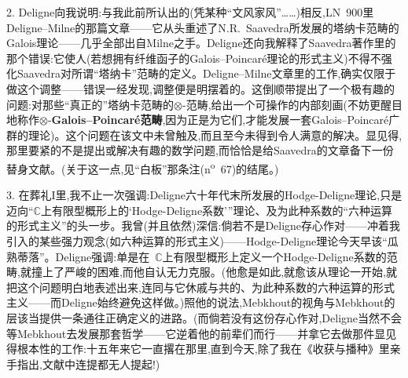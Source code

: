 2. Deligne向我说明:与我此前所认出的\dmark{}(凭某种“文风家风”……)相反,LN~900里Deligne--Milne的那篇文章——它从头重述了N.R.~Saavedra所发展的塔纳卡范畴的Galois理论——几乎全部出自Milne之手。Deligne还向我解释了Saavedra著作里的那个错误:它使人(若想拥有纤维函子的Galois--Poincaré理论的形式主义)不得不强化Saavedra对所谓“塔纳卡”范畴的定义。Deligne--Milne文章里的工作,确实仅限于做这个调整——错误一经发现,调整便是明摆着的。这倒顺带提出了一个极有趣的问题:对那些“真正的”塔纳卡范畴的$\otimes$-范畴,给出一个可操作的内部刻画(不妨更醒目地称作$\otimes$-\textbf{Galois--Poincaré范畴},因为正是为它们,才能发展一套Galois--Poincaré广群的理论)。这个问题在该文中未曾触及,而且至今未得到令人满意的解决。显见得,那里要紧的不是提出或解决有趣的数学问题,而恰恰是给Saavedra的文章备下一份替身文献。(关于这一点,见“白板”那条注(n\textsuperscript{o}~67)的结尾。)

3. 在葬礼I里,我不止一次强调:Deligne六十年代末所发展的Hodge-Deligne理论,只是迈向“$\mathbb{C}$上有限型概形上的‘Hodge-Deligne系数’”理论、及为此种系数的“六种运算的形式主义”的头一步。我曾(并且依然)深信:倘若不是Deligne存心作对——冲着我引入的某些强力观念(如六种运算的形式主义)——Hodge-Deligne理论今天早该“瓜熟蒂落”。Deligne强调:单是在~$\mathbb{C}$上有限型概形上定义一个Hodge-Deligne系数的范畴,就撞上了严峻的困难\dmark{},而他自认无力克服。(他愈是如此,就愈该从理论一开始,就把这个问题明白地表述出来,连同与它休戚与共的、为此种系数的六种运算的形式主义——而Deligne始终避免这样做。)照他的说法,Mebkhout的视角与Mebkhout的层该当提供一条通往正确定义的进路。(而倘若没有这份存心作对,Deligne当然不会等Mebkhout去发展那套哲学——它逆着他的前辈们而行——并拿它去做那件显见得根本性的工作:十五年来它一直撂在那里,直到今天,除了我在《收获与播种》里亲手指出,文献中连提都无人提起!)


